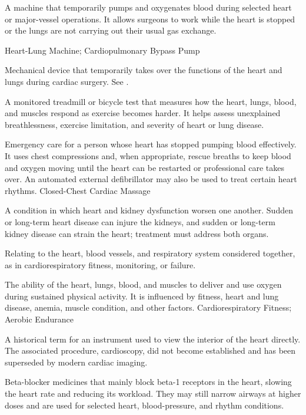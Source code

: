  A machine that temporarily pumps and oxygenates blood during selected heart or major-vessel operations. It allows surgeons to work while the heart is stopped or the lungs are not carrying out their usual gas exchange.

\synonyms
Heart-Lung Machine; Cardiopulmonary Bypass Pump

 Mechanical device that temporarily takes over the functions of the heart and lungs during cardiac surgery. See .

 A monitored treadmill or bicycle test that measures how the heart, lungs, blood, and muscles respond as exercise becomes harder. It helps assess unexplained breathlessness, exercise limitation, and severity of heart or lung disease.

 Emergency care for a person whose heart has stopped pumping blood effectively. It uses chest compressions and, when appropriate, rescue breaths to keep blood and oxygen moving until the heart can be restarted or professional care takes over. An automated external defibrillator may also be used to treat certain heart rhythms.
\synonyms
Closed-Chest Cardiac Massage


 A condition in which heart and kidney dysfunction worsen one another. Sudden or long-term heart disease can injure the kidneys, and sudden or long-term kidney disease can strain the heart; treatment must address both organs.

 Relating to the heart, blood vessels, and respiratory system considered together, as in cardiorespiratory fitness, monitoring, or failure.

 The ability of the heart, lungs, blood, and muscles to deliver and use oxygen during sustained physical activity. It is influenced by fitness, heart and lung disease, anemia, muscle condition, and other factors.
\synonyms
Cardiorespiratory Fitness; Aerobic Endurance

 A historical term for an instrument used to view the interior of the heart directly. The associated procedure, cardioscopy, did not become established and has been superseded by modern cardiac imaging.

 Beta-blocker medicines that mainly block beta-1 receptors in the heart, slowing the heart rate and reducing its workload. They may still narrow airways at higher doses and are used for selected heart, blood-pressure, and rhythm conditions.

